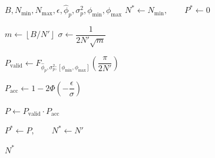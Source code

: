 \begin{algorithm}
    \caption{Statistical safeguard subroutine}
    \label{alg:stat-safeguard-subroutine}
    \begin{algorithmic}
        {$B, N_{\text{min}}, N_{\text{max}},
                \epsilon, \hat\phi_p, \sigma_p^2,
                \phi_{\text{min}}, \phi_{\text{max}}$}
        \State $N^* \gets N_\text{min},
            \qquad P^* \gets 0$

        \State $m \gets \left\lfloor B / N' \right\rfloor$
        \State $\sigma \gets \dfrac{1}{2N'\sqrt{m}}$

        \State $P_{\text{valid}}
            \gets
            F_{\hat\phi_p,\sigma_p^2;
            [\phi_{\text{min}},\phi_{\text{max}}]}
            \left(\dfrac{\pi}{2N'}\right)$

        \State $P_{\text{acc}}
            \gets
            1 - 2\Phi\left(-\dfrac{\epsilon}{\sigma}\right)$

        \State $P \gets P_{\text{valid}} \cdot P_{\text{acc}}$

        \State $P^* \gets P,
            \qquad N^* \gets N'$
        \EndIf
        \EndFor

        \State \Return $N^*$
        \EndProcedure
    \end{algorithmic}
\end{algorithm}
